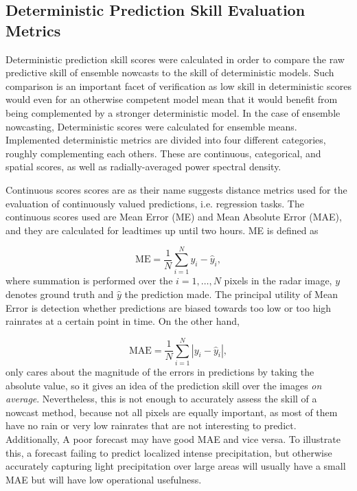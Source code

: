 \subsection{Deterministic Prediction Skill Evaluation Metrics}
\label{section:det_metric}

Deterministic prediction skill scores were calculated in order to compare the raw predictive skill of ensemble nowcasts to the skill of deterministic models. Such comparison is an important facet of verification as low skill in deterministic scores would even for an otherwise competent model mean that it would benefit from being complemented by a stronger deterministic model. In the case of ensemble nowcasting, Deterministic scores were calculated for ensemble means. Implemented deterministic metrics are divided into four different categories, roughly complementing each others. These are continuous, categorical, and spatial scores, as well as radially-averaged power spectral density.  

Continuous scores scores are as their name suggests distance metrics used for the evaluation of continuously valued predictions, i.e. regression tasks. The continuous scores used are Mean Error (ME) and Mean Absolute Error (MAE), and they are calculated for leadtimes up until two hours. ME is defined as 

\begin{equation}
	\text{ME} = \frac{1}{N}\sum_{i=1}^{N} y_i - \hat{y}_i,
\end{equation}
%
where summation is performed over the $i=1,\dots,N$ pixels in the radar image, $y$ denotes ground truth and $\hat{y}$ the prediction made. The principal utility of Mean Error is detection whether predictions are biased towards too low or too high rainrates at a certain point in time. On the other hand, 

\begin{equation}
	\text{MAE} = \frac{1}{N}\sum_{i=1}^{N} |y_i - \hat{y}_i|,
\end{equation}
%
only cares about the magnitude of the errors in predictions by taking the absolute value, so it gives an idea of the prediction skill over the images \textit{on average}. Nevertheless, this is not enough to accurately assess the skill of a nowcast method, because not all pixels are equally important, as most of them have no rain or very low rainrates that are not interesting to predict. Additionally, A poor forecast may have good MAE and vice versa. To illustrate this, a forecast failing to predict localized intense precipitation, but otherwise accurately capturing light precipitation over large areas will usually have a small MAE but will have low operational usefulness.


